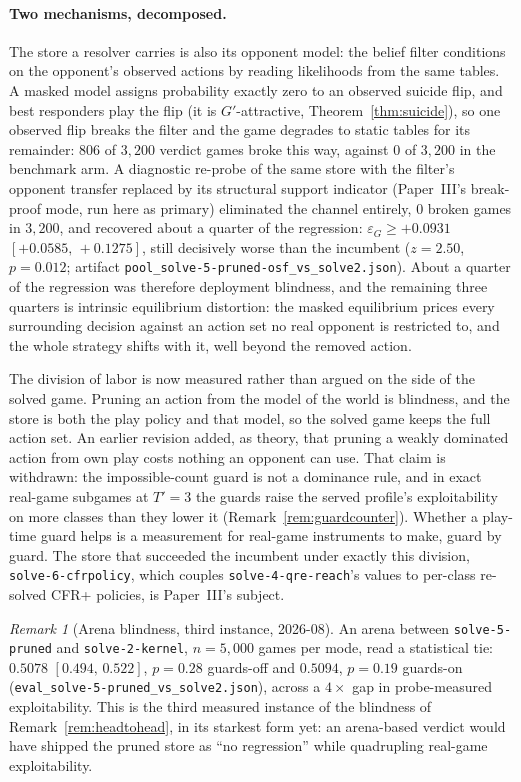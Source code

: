 \documentclass[11pt]{article}
\theoremstyle{plain}
\theoremstyle{definition}
\theoremstyle{remark}
\newtheorem{remark}[theorem]{Remark}
\newcommand{\code}[1]{\texttt{\small #1}}
\newcommand{\game}{\ensuremath{G}}
\newcommand{\gp}{\ensuremath{G'}}
\newcommand{\epsG}{\ensuremath{\varepsilon_{\game}}}
\begin{document}
\paragraph{Two mechanisms, decomposed.} The store a resolver carries
is also its opponent model: the belief filter conditions on the
opponent's observed actions by reading likelihoods from the same
tables. A masked model assigns probability exactly zero to an
observed suicide flip, and best responders play the flip (it is
$\gp$-attractive, Theorem~\ref{thm:suicide}), so one observed flip
breaks the filter and the game degrades to static tables for its
remainder: $806$ of $3{,}200$ verdict games broke this way, against
$0$ of $3{,}200$ in the benchmark arm. A diagnostic re-probe of the
same store with the filter's opponent transfer replaced by its
structural support indicator (Paper~III's break-proof mode, run here
as primary) eliminated the channel entirely, $0$ broken games in
$3{,}200$, and recovered about a quarter of the regression:
$\epsG \ge +0.0931$ $[+0.0585,\,+0.1275]$, still decisively worse
than the incumbent ($z=2.50$, $p=0.012$; artifact
\code{pool\_solve-5-pruned-osf\_vs\_solve2.json}).
About a quarter of the regression was therefore deployment blindness,
and the remaining three quarters is intrinsic equilibrium distortion:
the masked equilibrium prices every surrounding decision against an
action set no real opponent is restricted to, and the whole strategy
shifts with it, well beyond the removed action.

The division of labor is now measured rather than argued on the side
of the solved game. Pruning an action from the model of the world is
blindness, and the store is both the play policy and that model, so the
solved game keeps the full action set. An earlier revision added, as
theory, that pruning a weakly dominated action from own play costs
nothing an opponent can use. That claim is withdrawn: the
impossible-count guard is not a dominance rule, and in exact real-game
subgames at $T'=3$ the guards raise the served profile's
exploitability on more classes than they lower it
(Remark~\ref{rem:guardcounter}). Whether a play-time guard helps is a
measurement for real-game instruments to make, guard by guard. The store that succeeded the incumbent under exactly this
division, \code{solve-6-cfrpolicy}, which couples
\code{solve-4-qre-reach}'s values to per-class re-solved CFR+
policies, is Paper~III's subject.

\begin{remark}[Arena blindness, third instance, 2026-08]
\label{rem:arenablind3}
An arena between \code{solve-5-pruned} and \code{solve-2-kernel},
$n=5{,}000$ games per mode, read a statistical tie: $0.5078$
$[0.494,\,0.522]$, $p=0.28$ guards-off and $0.5094$, $p=0.19$
guards-on (\code{eval\_solve-5-pruned\_vs\_solve2.json}), across a
$4\times$ gap in probe-measured exploitability. This is the
third measured instance of the blindness of
Remark~\ref{rem:headtohead}, in its starkest form yet: an
arena-based verdict would have shipped the pruned store as ``no
regression'' while quadrupling real-game exploitability.
\end{remark}
\end{document}
